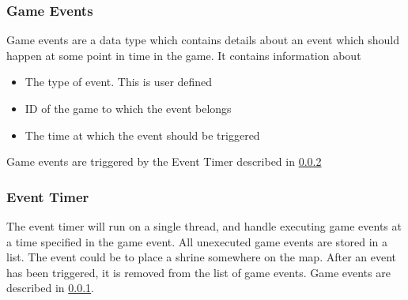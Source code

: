 \subsubsection{Game Events}\label{subsec:gameEvents}
Game events are a data type which contains details about an event which should happen at some point in time in the game. It contains information about

\begin{itemize}
\item The type of event. This is user defined
\item ID of the game to which the event belongs
\item The time at which the event should be triggered
\end{itemize}

Game events are triggered by the Event Timer described in \cref{subsec:eventtimerdesign}

\subsubsection{Event Timer}\label{subsec:eventtimerdesign}
The event timer will run on a single thread, and handle executing game events at a time specified in the game event. All unexecuted game events are stored in a list. The event could be to place a shrine somewhere on the map. After an event has been triggered, it is removed from the list of game events. Game events are described in \cref{subsec:gameEvents}.